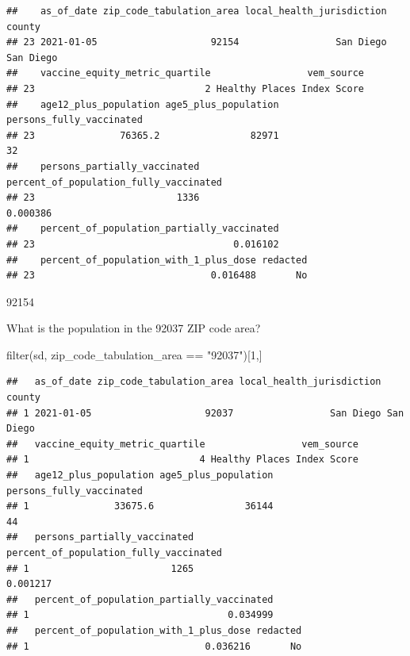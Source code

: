 \documentclass[
]{article}
\newenvironment{Shaded}{\begin{snugshade}}{\end{snugshade}}
\newcommand{\DecValTok}[1]{\textcolor[rgb]{0.00,0.00,0.81}{#1}}
\newcommand{\FunctionTok}[1]{\textcolor[rgb]{0.00,0.00,0.00}{#1}}
\newcommand{\NormalTok}[1]{#1}
\newcommand{\SpecialCharTok}[1]{\textcolor[rgb]{0.00,0.00,0.00}{#1}}
\newcommand{\StringTok}[1]{\textcolor[rgb]{0.31,0.60,0.02}{#1}}
\begin{document}
\begin{Shaded}
\end{Shaded}

\begin{verbatim}
##    as_of_date zip_code_tabulation_area local_health_jurisdiction    county
## 23 2021-01-05                    92154                 San Diego San Diego
##    vaccine_equity_metric_quartile                 vem_source
## 23                              2 Healthy Places Index Score
##    age12_plus_population age5_plus_population persons_fully_vaccinated
## 23               76365.2                82971                       32
##    persons_partially_vaccinated percent_of_population_fully_vaccinated
## 23                         1336                               0.000386
##    percent_of_population_partially_vaccinated
## 23                                   0.016102
##    percent_of_population_with_1_plus_dose redacted
## 23                               0.016488       No
\end{verbatim}

92154

What is the population in the 92037 ZIP code area?

\begin{Shaded}
\begin{Highlighting}[]
\FunctionTok{filter}\NormalTok{(sd, zip\_code\_tabulation\_area }\SpecialCharTok{==} \StringTok{"92037"}\NormalTok{)[}\DecValTok{1}\NormalTok{,]}
\end{Highlighting}
\end{Shaded}

\begin{verbatim}
##   as_of_date zip_code_tabulation_area local_health_jurisdiction    county
## 1 2021-01-05                    92037                 San Diego San Diego
##   vaccine_equity_metric_quartile                 vem_source
## 1                              4 Healthy Places Index Score
##   age12_plus_population age5_plus_population persons_fully_vaccinated
## 1               33675.6                36144                       44
##   persons_partially_vaccinated percent_of_population_fully_vaccinated
## 1                         1265                               0.001217
##   percent_of_population_partially_vaccinated
## 1                                   0.034999
##   percent_of_population_with_1_plus_dose redacted
## 1                               0.036216       No
\end{verbatim}
\end{document}
